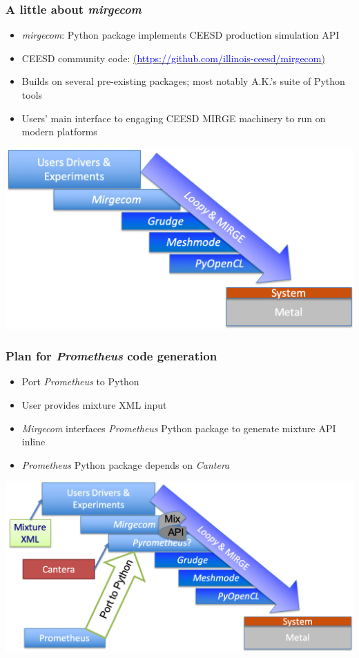 \begin{frame}\frametitle{A little about \textit{mirgecom}}
\begin{multicols}{2}
\begin{itemize}
  \item \textit{mirgecom}: Python package implements CEESD production simulation API
  \item CEESD community code: \href{https://github.com/illinois-ceesd/mirgecom}{(\textcolor{blue}{https://github.com/illinois-ceesd/mirgecom})}
  \item Builds on several pre-existing packages; most notably A.K.'s suite of Python tools
  \item Users' main interface to engaging CEESD MIRGE machinery to run on modern platforms
\end{itemize}
\end{multicols}
\begin{center}
\includegraphics[width=.8\textwidth]{figures/mirgecom_cartoon.png}
\end{center}
\end{frame}

\begin{frame}\frametitle{Plan for \textit{Prometheus} code generation}
\begin{multicols}{2}
\begin{itemize}
  \item Port \textit{Prometheus} to Python
  \item User provides mixture XML input
  \item \textit{Mirgecom} interfaces \textit{Prometheus} Python package to generate mixture API inline
  \item \textit{Prometheus} Python package depends on \textit{Cantera}
\end{itemize}
\end{multicols}
\begin{center}
\includegraphics[width=.8\textwidth]{figures/ultimate_integration.png}
\end{center}
\end{frame}

